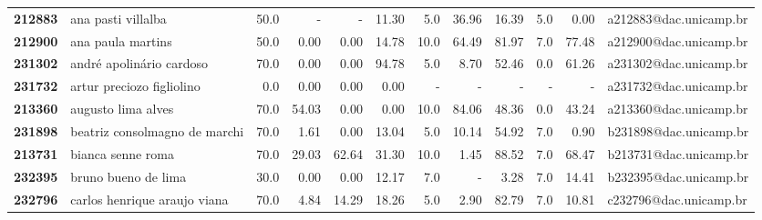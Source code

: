 \documentclass[11pt]{article}
\begin{document}
\begin{center}
\begin{landscape}
\begin{longtable}{llrrrrrrrrrl}
\bottomrule
\endlastfoot
\textbf{212883} &                    ana pasti villalba &                  50.0 &           - &           - &       11.30 &                      5.0 &       36.96 &       16.39 &                        5.0 &        0.00 &  a212883@dac.unicamp.br \\
\textbf{212900} &                     ana paula martins &                  50.0 &        0.00 &        0.00 &       14.78 &                     10.0 &       64.49 &       81.97 &                        7.0 &       77.48 &  a212900@dac.unicamp.br \\
\textbf{231302} &              andré apolinário cardoso &                  70.0 &        0.00 &        0.00 &       94.78 &                      5.0 &        8.70 &       52.46 &                        0.0 &       61.26 &  a231302@dac.unicamp.br \\
\textbf{231732} &             artur preciozo figliolino &                   0.0 &        0.00 &        0.00 &        0.00 &                        - &           - &           - &                          - &           - &  a231732@dac.unicamp.br \\
\textbf{213360} &                    augusto lima alves &                  70.0 &       54.03 &        0.00 &        0.00 &                     10.0 &       84.06 &       48.36 &                        0.0 &       43.24 &  a213360@dac.unicamp.br \\
\textbf{231898} &         beatriz consolmagno de marchi &                  70.0 &        1.61 &        0.00 &       13.04 &                      5.0 &       10.14 &       54.92 &                        7.0 &        0.90 &  b231898@dac.unicamp.br \\
\textbf{213731} &                     bianca senne roma &                  70.0 &       29.03 &       62.64 &       31.30 &                     10.0 &        1.45 &       88.52 &                        7.0 &       68.47 &  b213731@dac.unicamp.br \\
\textbf{232395} &                   bruno bueno de lima &                  30.0 &        0.00 &        0.00 &       12.17 &                      7.0 &           - &        3.28 &                        7.0 &       14.41 &  b232395@dac.unicamp.br \\
\textbf{232796} &          carlos henrique araujo viana &                  70.0 &        4.84 &       14.29 &       18.26 &                      5.0 &        2.90 &       82.79 &                        7.0 &       10.81 &  c232796@dac.unicamp.br \\

\end{longtable}
\end{landscape}
\end{center}
\end{document}
